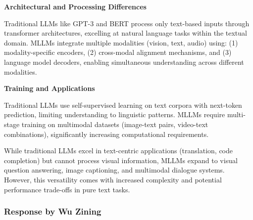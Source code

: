 \documentclass[12pt,a4paper]{article}
\begin{document}
\textbf{Architectural and Processing Differences}

Traditional LLMs like GPT-3 and BERT process only text-based inputs through transformer architectures, excelling at natural language tasks within the textual domain. MLLMs integrate multiple modalities (vision, text, audio) using: (1) modality-specific encoders, (2) cross-modal alignment mechanisms, and (3) language model decoders, enabling simultaneous understanding across different modalities.

\textbf{Training and Applications}

Traditional LLMs use self-supervised learning on text corpora with next-token prediction, limiting understanding to linguistic patterns. MLLMs require multi-stage training on multimodal datasets (image-text pairs, video-text combinations), significantly increasing computational requirements.

While traditional LLMs excel in text-centric applications (translation, code completion) but cannot process visual information, MLLMs expand to visual question answering, image captioning, and multimodal dialogue systems. However, this versatility comes with increased complexity and potential performance trade-offs in pure text tasks.

\subsubsection{Response by Wu Zining}
\end{document}
